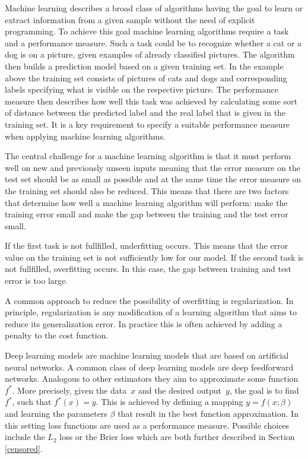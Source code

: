 \documentclass[12pt, a4paper]{scrartcl}
\theoremstyle{definition}
\theoremstyle{plain}
\numberwithin{equation}{section}
\numberwithin{figure}{section}
\numberwithin{table}{section}
\begin{document}
	Machine learning describes a broad class of algorithms having the goal to learn or extract information from a given sample without the need of explicit programming.
	To achieve this goal machine learning algorithms require a task and a performance measure.
	Such a task could be to recognize whether a cat or a dog is on a picture, given examples of already classified pictures.
	The algorithm then builds a prediction model based on a given training set.
	In the example above the training set consists of pictures of cats and dogs and corresponding labels specifying what is visible on the respective picture.
	The performance measure then describes how well this task was achieved by calculating some sort of distance between the predicted label and the real label that is given in the training set.
	It is a key requirement to specify a suitable performance measure when applying machine learning algorithms.
	

	The central challenge for a machine learning algorithm is that it must perform well on new and previously unseen inputs meaning that the error measure on the test set should be as small as possible and at the same time the error measure on the training set should also be reduced.
	This means that there are two factors that determine how well a machine learning algorithm will perform:
	make the training error small and make the gap between the training and the test error small.
	
	If the first task is not fullfilled, underfitting occurs. This means that the error value on the training set is not sufficiently low for our model.
	If the second task is not fullfilled, overfitting occurs. In this case, the gap between training and test error is too large.
	
	A common approach to reduce the possibility of overfitting is regularization.
	In principle, regularization is any modification of a learning algorithm that aims to reduce its generalization error.
	In practice this is often achieved by adding a penalty to the cost function.
	
	Deep learning models are machine learning models that are based on artificial neural networks.
	A common class of deep learning models are deep feedforward networks. Analogous to other estimators they aim to approximate some function~$f^*$.
	More precisely, given the data~$x$ and the desired output~$y$, the goal is to find $f^*$, such that $f^*(x)=y$.
	This is achieved by defining a mapping $y = f(x; \beta)$ and learning the parameters $\beta$ that result in the best function approximation.
	In this setting loss functions are used as a performance measure.
	Possible choices include the $L_2$ loss or the Brier loss which are both further described in Section \ref{censored}.
	
\end{document}

